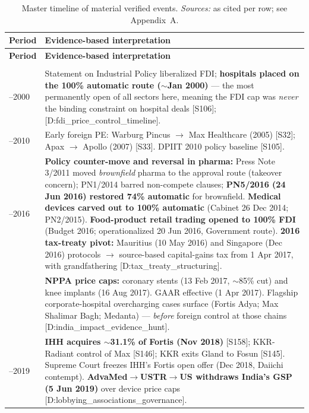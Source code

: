\documentclass[11pt,a4paper]{article}
\newcommand{\cs}[1]{\textnormal{[#1]}}
\begin{document}
\begin{small}
\setlength{\tabcolsep}{4pt}
\begin{longtable}{>{\raggedright\arraybackslash}p{1.7cm} >{\raggedright\arraybackslash}p{13.5cm}}
\caption{Master timeline of material verified events. \textit{Sources:} as cited per row; see Appendix~A.}\label{tab:timeline}\\
\toprule
\textbf{Period} & \textbf{Evidence-based interpretation} \\
\midrule
\endfirsthead
\toprule
\textbf{Period} & \textbf{Evidence-based interpretation} \\
\midrule
\endhead
\midrule \multicolumn{2}{r}{\footnotesize\itshape continued on next page}\\
\endfoot
\bottomrule
\endlastfoot
1991--2000 & 1991 Statement on Industrial Policy liberalized FDI; \textbf{hospitals placed on the 100\% automatic route ($\sim$Jan 2000)} --- the most permanently open of all sectors here, meaning the FDI cap was \emph{never} the binding constraint on hospital deals \cs{S106}; \cs{D:fdi\_price\_control\_timeline}. \\
2005--2010 & Early foreign PE: Warburg Pincus $\rightarrow$ Max Healthcare (2005) \cs{S32}; Apax $\rightarrow$ Apollo (2007) \cs{S33}. DPIIT 2010 policy baseline \cs{S105}. \\
2011--2016 & \textbf{Policy counter-move and reversal in pharma:} Press Note 3/2011 moved \emph{brownfield} pharma to the approval route (takeover concern); PN1/2014 barred non-compete clauses; \textbf{PN5/2016 (24 Jun 2016) restored 74\% automatic} for brownfield. \textbf{Medical devices carved out to 100\% automatic} (Cabinet 26 Dec 2014; PN2/2015). \textbf{Food-product retail trading opened to 100\% FDI} (Budget 2016; operationalized 20 Jun 2016, Government route). \textbf{2016 tax-treaty pivot:} Mauritius (10 May 2016) and Singapore (Dec 2016) protocols $\rightarrow$ source-based capital-gains tax from 1 Apr 2017, with grandfathering \cs{D:tax\_treaty\_structuring}. \\
2017 & \textbf{NPPA price caps:} coronary stents (13 Feb 2017, $\sim$85\% cut) and knee implants (16 Aug 2017). GAAR effective (1 Apr 2017). Flagship corporate-hospital overcharging cases surface (Fortis Adya; Max Shalimar Bagh; Medanta) --- \emph{before} foreign control at those chains \cs{D:india\_impact\_evidence\_hunt}. \\
2018--2019 & \textbf{IHH acquires $\sim$31.1\% of Fortis (Nov 2018)} \cs{S158}; KKR-Radiant control of Max \cs{S146}; KKR exits Gland to Fosun \cs{S145}. Supreme Court freezes IHH's Fortis open offer (Dec 2018, Daiichi contempt). \textbf{AdvaMed$\rightarrow$USTR$\rightarrow$US withdraws India's GSP (5 Jun 2019)} over device price caps \cs{D:lobbying\_associations\_governance}. \\

\end{longtable}
\end{small}
\end{document}
